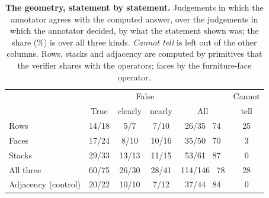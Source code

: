 \begin{table}[t]
\centering
\small
\setlength{\tabcolsep}{2.6pt}
\caption{\textbf{The geometry, statement by statement.} Judgements in which the annotator agrees with the computed answer, over the judgements in which the annotator decided, by what the statement shown was; the share (\%) is over all three kinds. \emph{Cannot tell} is left out of the other columns. Rows, stacks and adjacency are computed by primitives that the verifier shares with the operators; faces by the furniture-face operator.}
\label{tab:supp_human_b}
\begin{tabular}{@{}lccccc@{}}
\toprule
 & & \multicolumn{2}{c}{False} & & Cannot \\
 & True & clearly & nearly & All & tell \\
\midrule
Rows & 14/18 & 5/7 & 7/10 & 26/35 ~74 & 25 \\
Faces & 17/24 & 8/10 & 10/16 & 35/50 ~70 & 3 \\
Stacks & 29/33 & 13/13 & 11/15 & 53/61 ~87 & 0 \\
\addlinespace
All three & 60/75 & 26/30 & 28/41 & 114/146 ~78 & 28 \\
Adjacency (control) & 20/22 & 10/10 & 7/12 & 37/44 ~84 & 0 \\
\bottomrule
\end{tabular}
\end{table}
